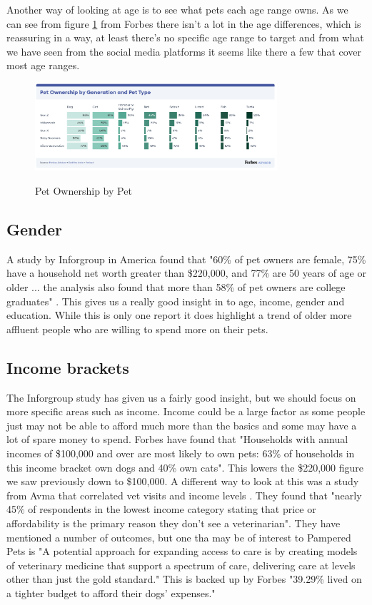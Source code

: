 \documentclass{article}
\begin{document}
Another way of looking at age is to see what pets each age range owns. As we can see from figure \ref{fig:pets} from Forbes \cite{ownersage} there isn't a lot in the age differences, which is reassuring in a way, at least there's no specific age range to target and from what we have seen from the social media platforms it seems like there a few that cover most age ranges.

\FloatBarrier
\begin{figure}[ht]
    \caption{Pet Ownership by Pet}
    \centering
    \includegraphics[width=0.8\textwidth]{OwnersByAge}
    \label{fig:pets}
    \end{figure}
    \FloatBarrier

\subsection{Gender}
A study by Inforgroup in America found that "60\% of pet owners are female, 75\% have a household net worth greater than \$220,000, and 77\% are 50 years of age or older ... the analysis also found that more than 58\% of pet owners are college graduates" \cite{data}. This gives us a really good insight in to age, income, gender and education. While this is only one report it does highlight a trend of older more affluent people who are willing to spend more on their pets.

\subsection{Income brackets}
The Inforgroup study \cite{data} has given us a fairly good insight, but we should focus on more specific areas such as income. Income could be a large factor as some people just may not be able to afford much more than the basics and some may have a lot of spare money to spend.
Forbes \cite{forbes} have found that "Households with annual incomes of \$100,000 and over are most likely to own pets: 63\% of households in this income bracket own dogs and 40\% own cats". This lowers the \$220,000 figure we saw previously down to \$100,000.
A different way to look at this was a study from Avma that correlated vet visits and income levels \cite{avma}. They found that "nearly 45\% of respondents in the lowest income category stating that price or affordability is the primary reason they don’t see a veterinarian". They have mentioned a number of outcomes, but one tha may be of interest to Pampered Pets is "A potential approach for expanding access to care is by creating models of veterinary medicine that support a spectrum of care, delivering care at levels other than just the gold standard." This is backed up by Forbes "39.29\% lived on a tighter budget to afford their dogs’ expenses." \cite{forbes}
\end{document}
